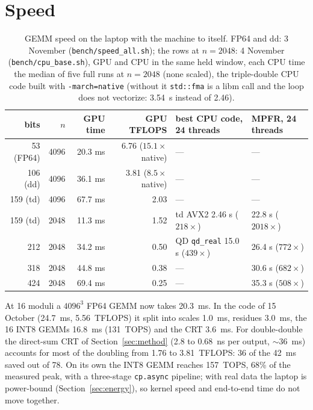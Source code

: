 \documentclass[11pt]{article}
\begin{document}
\section{Speed}\label{sec:speed}
\begin{table}[h]\centering
\caption{GEMM speed on the laptop with the machine to itself. FP64 and dd: 3 November (\texttt{bench/speed\_all.sh}); the
rows at $n=2048$: 4 November (\texttt{bench/cpu\_base.sh}), GPU and CPU in the same held window, each CPU time the median of
five full runs at $n=2048$ (none scaled), the triple-double CPU code built with \texttt{-march=native} (without it
\texttt{std::fma} is a libm call and the loop does not vectorize: 3.54~s instead of 2.46).}\label{tab:speed}
\small
\setlength{\tabcolsep}{4pt}
\begin{tabular}{rrrrll}\toprule
bits & $n$ & GPU time & GPU TFLOPS & best CPU code, 24 threads & MPFR, 24 threads \\\midrule
53 (FP64) & 4096 & 20.3 ms & 6.76 ($15.1\times$ native) & --- & --- \\
106 (dd) & 4096 & 36.1 ms & 3.81 ($8.5\times$ native) & --- & --- \\
159 (td) & 4096 & 67.7 ms & 2.03 & --- & --- \\
159 (td) & 2048 & 11.3 ms & 1.52 & td AVX2 2.46 s ($218\times$) & 22.8 s ($2018\times$) \\
212 & 2048 & 34.2 ms & 0.50 & QD \texttt{qd\_real} 15.0 s ($439\times$) & 26.4 s ($772\times$) \\
318 & 2048 & 44.8 ms & 0.38 & --- & 30.6 s ($682\times$) \\
424 & 2048 & 69.4 ms & 0.25 & --- & 35.3 s ($508\times$) \\\bottomrule
\end{tabular}
\end{table}
At 16 moduli a $4096^3$ FP64 GEMM now takes 20.3~ms. In the code of 15 October (24.7~ms, 5.56~TFLOPS) it split into scales
1.0~ms, residues 3.0~ms, the 16 INT8 GEMMs 16.8~ms (131~TOPS) and the CRT 3.6~ms. For double-double the direct-sum CRT of
Section~\ref{sec:method} (2.8 to 0.68~ns per output, $\sim$36~ms) accounts for most of the doubling from 1.76 to
3.81~TFLOPS: 36 of the 42~ms saved out of 78. On its own the INT8 GEMM reaches 157~TOPS, 68\% of the measured peak, with a three-stage \texttt{cp.async} pipeline; with
real data the laptop is power-bound (Section~\ref{sec:energy}), so kernel speed and end-to-end time do not move together.
\end{document}
